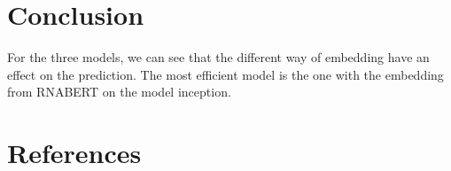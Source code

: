 \documentclass[12pt, oneside, a4paper]{report}
\begin{document}
\begin{multicols}{2}
\section*{Conclusion}
For the three models, we can see that the different way of embedding have an effect on the prediction. The most efficient model is the one with the embedding from RNABERT on the model inception.

\section*{References}
\begingroup
    \begin{footnotesize}
        \renewcommand{\chapter}[2]{}%
        
        
    \end{footnotesize}
\endgroup
\end{multicols}
\end{document}
